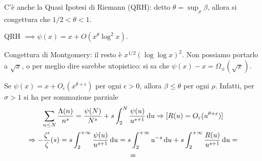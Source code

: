 C'è anche la Quasi Ipotesi di Riemann (QRH): detto $\displaystyle \theta=\sup_{\rho} \beta$, allora si congettura che $1/2<\theta<1$.

\begin{exc}
  QRH $\implies \psi(x)=x+O(x^{\theta}\log^2{x})$.
\end{exc}

Congettura di Montgomery: il resto è $x^{1/2}(\log\log{x})^2$. Non possiamo portarlo a $\sqrt{x}$, o per meglio dire sarebbe utopistico: si sa che $\psi(x)-x=\Omega_{\pm}(\sqrt{x})$.

\begin{oss}
  Se $\psi(x)=x+O_{\epsilon}(x^{\theta+\epsilon})$ per ogni $\epsilon>0$, allora $\beta \le \theta$ per ogni $\rho$. Infatti, per $\sigma>1$ si ha per sommazione parziale
  \begin{gather*}
    \sum_{n \le N} \frac{\Lambda(n)}{n^s}=\frac{\psi(N)}{N^s}+s\int_2^N \frac{\psi(u)}{u^{s+1}}\mathop{}\!\mathrm{d} u \Rightarrow \text{[}R(u)=O_{\varepsilon}(u^{\theta+\varepsilon})\text{]}\\
    \Rightarrow -\frac{\zeta'}{\zeta}(s)=s\int_2^{+\infty} \frac{\psi(u)}{u^{s+1}}\mathop{}\!\mathrm{d} u=s\int_2^{+\infty} u^{-s}\mathop{}\!\mathrm{d} u+s\int_2^{+\infty} \frac{R(u)}{u^{s+1}}\mathop{}\!\mathrm{d} u= \\
    =
  \end{gather*}
\end{oss}
